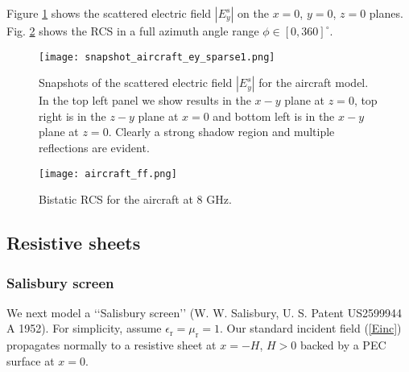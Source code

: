 \documentclass[a4paper,12pt]{article}
\newcommand{\epsr}{\epsilon_{\mathrm{r}}}
\newcommand{\mur}{\mu_{\mathrm{r}}}
\begin{document}
Figure \ref{fig:aircraft_snap} shows the scattered electric field $|E_y^s|$ on the $x=0$, $y=0$, $z=0$ planes. Fig. \ref{fig:aircraft_far} shows the RCS in a full azimuth angle range $\phi\in[0, 360]^\circ$. 

\begin{figure}[!htb]
    \centering
\texttt{[image: snapshot\_aircraft\_ey\_sparse1.png]} 
\caption{Snapshots of the scattered electric field $|E_y^s|$ for the aircraft model. In the top left panel we show results in the  $x-y$ plane at $z=0$, top right is in the $z-y$ plane at $x=0$ and bottom left is in the $x-y$ plane at $z=0$.  Clearly  a strong shadow region and multiple reflections are evident.}
    \label{fig:aircraft_snap}
\end{figure}

\begin{figure}[!htb]
    \centering
    \texttt{[image: aircraft\_ff.png]}
\caption{Bistatic RCS for the aircraft at 8 GHz.}
    \label{fig:aircraft_far}
\end{figure}



\subsection{Resistive sheets}\label{sec:res}

\subsubsection{Salisbury screen}

We next model a ‘`Salisbury screen'’ (W. W. Salisbury, U. S. Patent US2599944 A 1952). For simplicity, assume $\epsr=\mur=1$.
Our standard incident field (\ref{Einc}) propagates normally to a resistive sheet
at $x=-H$, $H>0$ backed by a PEC surface at $x=0$.
\end{document}
